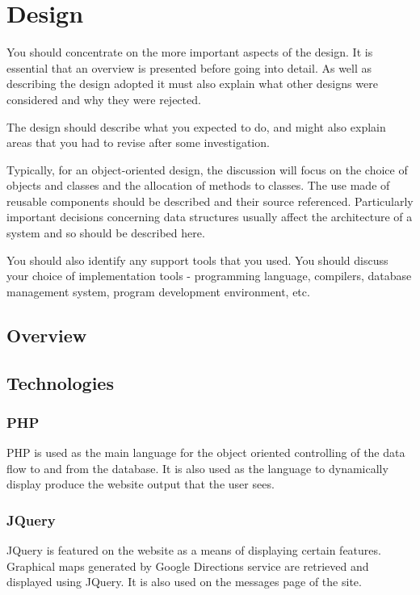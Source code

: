 \chapter{Design}

You should concentrate on the more important aspects of the design. It is essential that an overview is presented before going into detail. As well as describing the design adopted it must also explain what other designs were considered and why they were rejected.

The design should describe what you expected to do, and might also explain areas that you had to revise after some investigation.

Typically, for an object-oriented design, the discussion will focus on the choice of objects and classes and the allocation of methods to classes. The use made of reusable components should be described and their source referenced. Particularly important decisions concerning data structures usually affect the architecture of a system and so should be described here.
 
You should also identify any support tools that you used. You should discuss your choice of implementation tools - programming language, compilers, database management system, program development environment, etc. 

\section{Overview}
\section{Technologies}
	\subsection{PHP}
		PHP is used as the main language for the object oriented controlling of the data flow to and from the database. It is also used as the language to dynamically display produce the website output that the user sees.
		
	\subsection{JQuery}
		JQuery is featured on the website as a means of displaying certain features. Graphical maps generated by Google Directions \cite{google_directions_api} service are retrieved and displayed using JQuery. It is also used on the messages page of the site.	
			
